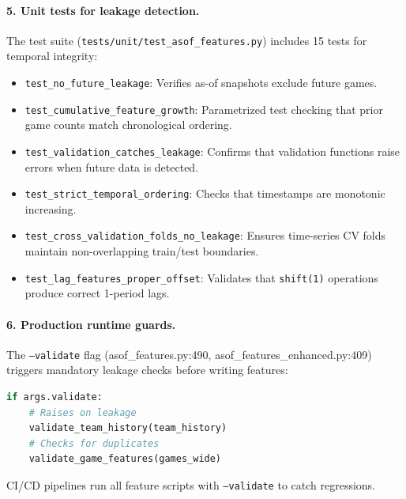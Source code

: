 \paragraph{5. Unit tests for leakage detection.}
The test suite (\texttt{tests/unit/test\_asof\_features.py}) includes 15 tests for temporal integrity:
\begin{itemize}
  \item \texttt{test\_no\_future\_leakage}: Verifies as-of snapshots exclude future games.
  \item \texttt{test\_cumulative\_feature\_growth}: Parametrized test checking that prior game counts match chronological ordering.
  \item \texttt{test\_validation\_catches\_leakage}: Confirms that validation functions raise errors when future data is detected.
  \item \texttt{test\_strict\_temporal\_ordering}: Checks that timestamps are monotonic increasing.
  \item \texttt{test\_cross\_validation\_folds\_no\_leakage}: Ensures time-series CV folds maintain non-overlapping train/test boundaries.
  \item \texttt{test\_lag\_features\_proper\_offset}: Validates that \texttt{shift(1)} operations produce correct 1-period lags.
\end{itemize}

\paragraph{6. Production runtime guards.}
The \texttt{--validate} flag (asof\_features.py:490, asof\_features\_enhanced.py:409) triggers mandatory leakage checks before writing features:
\begin{lstlisting}[language=Python,basicstyle=\ttfamily\scriptsize,breaklines=true,postbreak=\mbox{\textcolor{red}{$\hookrightarrow$}\space}]
if args.validate:
    # Raises on leakage
    validate_team_history(team_history)
    # Checks for duplicates
    validate_game_features(games_wide)
\end{lstlisting}
CI/CD pipelines run all feature scripts with \texttt{--validate} to catch regressions.

